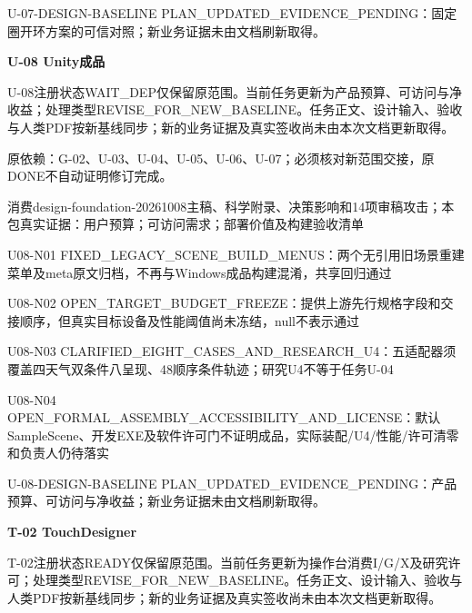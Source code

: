 \documentclass[11pt,a4paper]{article}
\newcommand{\reviewsection}[1]{\par\Needspace{5\baselineskip}\vspace{10pt}\begin{center}{\titlelatin\titlecjk\bfseries\fontsize{14}{20}\selectfont #1}\end{center}}
\begin{document}
U-\allowbreak{}07-\allowbreak{}DESIGN-\allowbreak{}BASELINE PLAN\_\allowbreak{}UPDATED\_\allowbreak{}EVIDENCE\_\allowbreak{}PENDING：固定圈开环方案的可信对照；新业务证据未由文档刷新取得。


\reviewsection{U-\allowbreak{}08 Unity成品}
U-\allowbreak{}08注册状态WAIT\_\allowbreak{}DEP仅保留原范围。当前任务更新为产品预算、可访问与净收益；处理类型REVISE\_\allowbreak{}FOR\_\allowbreak{}NEW\_\allowbreak{}BASELINE。任务正文、设计输入、验收与人类PDF按新基线同步；新的业务证据及真实签收尚未由本次文档更新取得。


原依赖：G-\allowbreak{}02、U-\allowbreak{}03、U-\allowbreak{}04、U-\allowbreak{}05、U-\allowbreak{}06、U-\allowbreak{}07；必须核对新范围交接，原DONE不自动证明修订完成。


消费design-\allowbreak{}foundation-\allowbreak{}20261008主稿、科学附录、决策影响和14项审稿攻击；本包真实证据：用户预算；可访问需求；部署价值及构建验收清单


U08-\allowbreak{}N01 FIXED\_\allowbreak{}LEGACY\_\allowbreak{}SCENE\_\allowbreak{}BUILD\_\allowbreak{}MENUS：两个无引用旧场景重建菜单及meta原文归档，不再与Windows成品构建混淆，共享回归通过


U08-\allowbreak{}N02 OPEN\_\allowbreak{}TARGET\_\allowbreak{}BUDGET\_\allowbreak{}FREEZE：提供上游先行规格字段和交接顺序，但真实目标设备及性能阈值尚未冻结，null不表示通过


U08-\allowbreak{}N03 CLARIFIED\_\allowbreak{}EIGHT\_\allowbreak{}CASES\_\allowbreak{}AND\_\allowbreak{}RESEARCH\_\allowbreak{}U4：五适配器须覆盖四天气双条件八呈现、48顺序条件轨迹；研究U4不等于任务U-\allowbreak{}04


U08-\allowbreak{}N04 OPEN\_\allowbreak{}FORMAL\_\allowbreak{}ASSEMBLY\_\allowbreak{}ACCESSIBILITY\_\allowbreak{}AND\_\allowbreak{}LICENSE：默认SampleScene、开发EXE及软件许可门不证明成品，实际装配/\allowbreak{}U4/\allowbreak{}性能/\allowbreak{}许可清零和负责人仍待落实


U-\allowbreak{}08-\allowbreak{}DESIGN-\allowbreak{}BASELINE PLAN\_\allowbreak{}UPDATED\_\allowbreak{}EVIDENCE\_\allowbreak{}PENDING：产品预算、可访问与净收益；新业务证据未由文档刷新取得。


\reviewsection{T-\allowbreak{}02 TouchDesigner}
T-\allowbreak{}02注册状态READY仅保留原范围。当前任务更新为操作台消费I/\allowbreak{}G/\allowbreak{}X及研究许可；处理类型REVISE\_\allowbreak{}FOR\_\allowbreak{}NEW\_\allowbreak{}BASELINE。任务正文、设计输入、验收与人类PDF按新基线同步；新的业务证据及真实签收尚未由本次文档更新取得。
\end{document}
